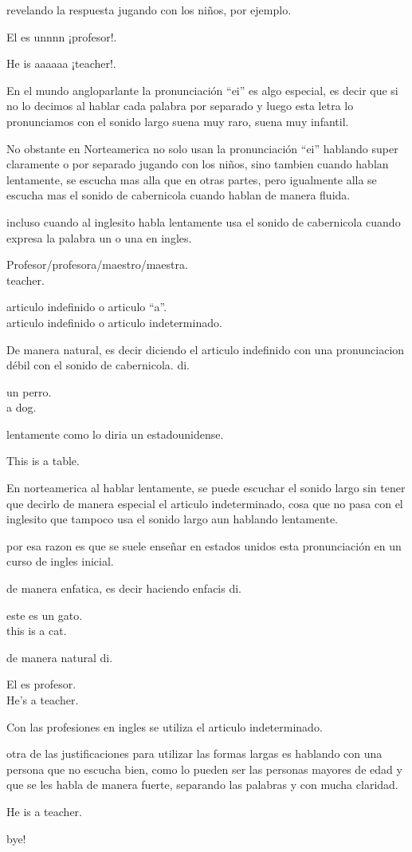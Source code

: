 revelando la respuesta jugando con los niños, por ejemplo.

El es unnnn ¡profesor!.

He is aaaaaa ¡teacher!.

En el mundo angloparlante la pronunciación ``ei'' es algo especial, es decir
que si no lo decimos al hablar cada palabra por separado y luego esta letra
lo pronunciamos con el sonido largo suena muy raro, suena muy infantil.

No obstante en Norteamerica no solo usan la pronunciación ``ei'' hablando
super claramente o por separado jugando con los niños, sino tambien cuando
hablan lentamente, se escucha mas alla que en otras partes, pero igualmente
alla se escucha mas el sonido de cabernicola cuando hablan de manera fluida.

incluso cuando al inglesito habla lentamente usa el sonido de cabernicola
cuando expresa la palabra un o una en ingles.

Profesor/profesora/maestro/maestra.\\
teacher.

articulo indefinido o articulo ``a''.\\

articulo indefinido o articulo indeterminado.

De manera natural, es decir diciendo el articulo indefinido con una
pronunciacion débil con el sonido de cabernicola. di.

un perro.\\
a dog.

lentamente como lo diria un estadounidense.

This is a table.

En norteamerica al hablar lentamente, se puede escuchar el sonido largo
sin tener que decirlo de manera especial el articulo indeterminado,
cosa que no pasa con el inglesito que tampoco usa
el sonido largo aun hablando lentamente.

por esa razon es que se suele enseñar en estados unidos esta pronunciación
en un curso de ingles inicial.

de manera enfatica, es decir haciendo enfacis di.

este es un gato.\\
this is a cat.

de manera natural di.

El es profesor.\\
He's a teacher.

Con las profesiones en ingles se utiliza el articulo indeterminado.

otra de las justificaciones para utilizar las formas largas es hablando
con una persona que no escucha bien, como lo pueden ser las personas mayores
de edad y que se les habla de manera fuerte, separando las palabras y con
mucha claridad.

He is a teacher.

bye!










